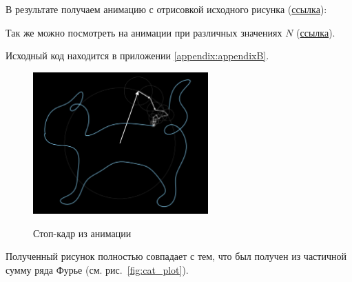 В результате получаем анимацию с отрисовкой исходного рисунка (\href{https://drive.google.com/file/d/1bMOGz81cHuQbmYTLcZKFB8C2WC-LNEim/view?usp=share_link}{ссылка}):  

Так же можно посмотреть на анимации при различных значениях $N$ (\href{https://drive.google.com/drive/folders/1dmXw8v6x5eByshXMqzxIWHGvhgOteTDo?usp=share_link}{ссылка}). 

Исходный код находится в приложении \ref{appendix:appendixB}. 

\begin{figure}[ht!]
    \centering
    \includegraphics[width=0.6\textwidth]{./media/cat_animation.png}
    \label{fig:cat_animation}
    \caption{Стоп-кадр из анимации}
\end{figure}
Полученный рисунок полностью совпадает с тем, что был получен из частичной сумму ряда Фурье (см. рис.~\ref{fig:cat_plot}).
